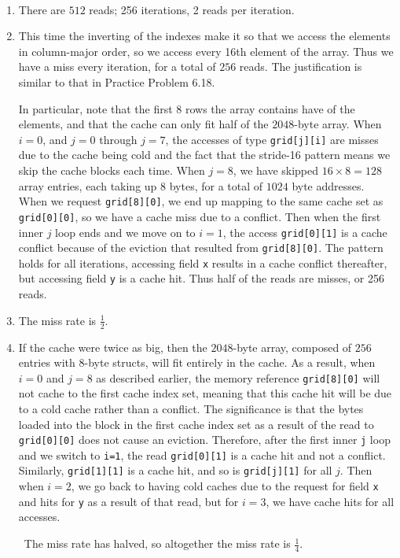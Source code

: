 \documentclass[12pt]{article}
\newenvironment{sol}[1][Solution]{\begin{trivlist}
		\item[\hskip \labelsep {\bfseries #1:}]}{\end{trivlist}}
\begin{document}
\begin{sol}
	\
	\begin{enumerate}[label=(\alph*)]
		\item There are $512$ reads; 256 iterations, 2 reads per iteration.
		
		\item This time the inverting of the indexes make it so that we access the
		elements in column-major order, so we access every 16th element of the array.
		Thus we have a miss every iteration, for a total of $256$ reads. The justification
		is similar to that in Practice Problem 6.18.
		
		In particular, note that the first 8 rows the array contains have of the elements,
		and that the cache can only fit half of the $2048$-byte array. When $i=0$,
		and $j=0$ through $j=7$, the accesses of type \texttt{grid[j][i]} are misses
		due to the cache being cold and the fact that the stride-16 pattern means we
		skip the cache blocks each time. When $j=8$, we have skipped $16\times 8=128$
		array entries, each taking up $8$ bytes, for a total of $1024$ byte addresses.
		When we request \texttt{grid[8][0]}, we end up mapping to the same cache set as
		\texttt{grid[0][0]}, so we have a cache miss due to a conflict. Then when the
		first inner $j$ loop ends and we move on to $i=1$, the access \texttt{grid[0][1]}
		is a cache conflict because of the eviction that resulted from \texttt{grid[8][0]}.
		The pattern holds for all iterations, accessing field \texttt{x} results in a cache
		conflict thereafter, but accessing field \texttt{y} is a cache hit. Thus half of the reads
		are misses, or 256 reads.
		
		\item The miss rate is $\frac{1}{2}$.
		
		\item If the cache were twice as big, then the $2048$-byte array, composed of
		$256$ entries with $8$-byte structs, will fit entirely in the cache. As a result,
		when $i=0$ and $j=8$ as described earlier, the memory reference \texttt{grid[8][0]}
		will not cache to the first cache index set, meaning that this cache hit will
		be due to a cold cache rather than a conflict. The significance is that the bytes
		loaded into the block in the first cache index set as a result of the read to
		\texttt{grid[0][0]} does not cause an eviction. Therefore, after the first inner
		\texttt{j} loop and we switch to \texttt{i=1}, the read \texttt{grid[0][1]} is
		a cache hit and not a conflict. Similarly, \texttt{grid[1][1]} is a cache hit,
		and so is \texttt{grid[j][1]} for all $j$. Then when $i=2$, we go back to having
		cold caches due to the request for field \texttt{x} and hits for \texttt{y} as
		a result of that read, but for $i=3$, we have cache hits for all accesses.
		
		\
		The miss rate has halved, so altogether the miss rate is $\frac{1}{4}$.
	\end{enumerate}
\end{sol}
\end{document}
